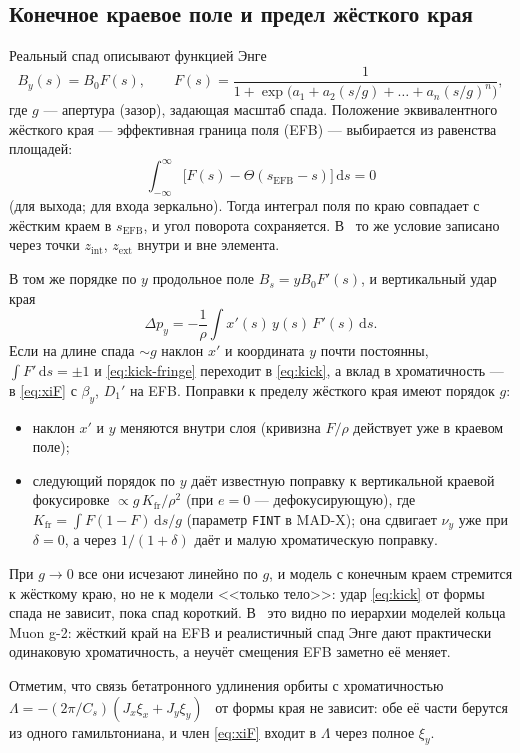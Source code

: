 \subsection{Конечное краевое поле и предел жёсткого края}

Реальный спад описывают функцией Энге~\cite{Enge1967,ValetovPhD}
\begin{equation}
\label{eq:enge}
B_y(s)=B_0F(s),
\qquad
F(s)=\frac{1}{1+\exp\bigl(a_1+a_2(s/g)+\dots+a_n(s/g)^n\bigr)},
\end{equation}
где $g$ --- апертура (зазор), задающая масштаб спада. Положение эквивалентного жёсткого края --- эффективная граница поля (EFB) --- выбирается из равенства площадей:
\begin{equation}
\label{eq:efb}
\int_{-\infty}^{\infty}\bigl[F(s)-\Theta(s_{\mathrm{EFB}}-s)\bigr]\,\mathrm{d}s=0
\end{equation}
(для выхода; для входа зеркально). Тогда интеграл поля по краю совпадает с жёстким краем в $s_{\mathrm{EFB}}$, и угол поворота сохраняется. В~\cite{ValetovPhD} то же условие записано через точки $z_{\mathrm{int}}$, $z_{\mathrm{ext}}$ внутри и вне элемента.

В том же порядке по $y$ продольное поле $B_s=yB_0F'(s)$, и вертикальный удар края
\begin{equation}
\label{eq:kick-fringe}
\Delta p_y=-\frac{1}{\rho}\int x'(s)\,y(s)\,F'(s)\,\mathrm{d}s .
\end{equation}
Если на длине спада $\sim g$ наклон $x'$ и координата $y$ почти постоянны, $\int F'\,\mathrm{d}s=\pm1$ и \eqref{eq:kick-fringe} переходит в \eqref{eq:kick}, а вклад в хроматичность --- в \eqref{eq:xiF} с $\beta_y$, $D_1'$ на EFB. Поправки к пределу жёсткого края имеют порядок $g$:
\begin{itemize}
\item наклон $x'$ и $y$ меняются внутри слоя (кривизна $F/\rho$ действует уже в краевом поле);
\item следующий порядок по $y$ даёт известную поправку к вертикальной краевой фокусировке $\propto g\,K_{\mathrm{fr}}/\rho^2$ (при $e=0$ --- дефокусирующую), где $K_{\mathrm{fr}}=\int F(1-F)\,\mathrm{d}s/g$ (параметр \texttt{FINT} в MAD-X); она сдвигает $\nu_y$ уже при $\delta=0$, а через $1/(1+\delta)$ даёт и малую хроматическую поправку.
\end{itemize}
При $g\to0$ все они исчезают линейно по $g$, и модель с конечным краем стремится к жёсткому краю, но не к модели <<только тело>>: удар \eqref{eq:kick} от формы спада не зависит, пока спад короткий. В~\cite{ValetovChrom2026} это видно по иерархии моделей кольца Muon g-2: жёсткий край на EFB и реалистичный спад Энге дают практически одинаковую хроматичность, а неучёт смещения EFB заметно её меняет.

Отметим, что связь бетатронного удлинения орбиты с хроматичностью $\Lambda=-(2\pi/C_s)(J_x\xi_x+J_y\xi_y)$~\cite{EqNote} от формы края не зависит: обе её части берутся из одного гамильтониана, и член \eqref{eq:xiF} входит в $\Lambda$ через полное $\xi_y$.

